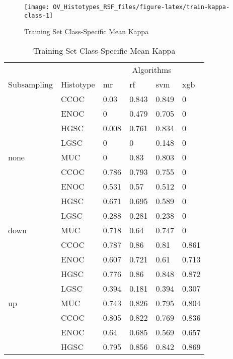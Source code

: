 \documentclass[
]{report}
\begin{document}
\begin{figure}[H]

{\centering \texttt{[image: OV\_Histotypes\_RSF\_files/figure-latex/train-kappa-class-1]} 

}

\caption{Training Set Class-Specific Mean Kappa}\label{fig:train-kappa-class}
\end{figure}

\begin{table}

\caption{\label{tab:train-kappa-class-table}Training Set Class-Specific Mean Kappa}
\centering
\begin{tabular}[t]{l|l|l|l|l|l}
\hline
\multicolumn{2}{c|}{ } & \multicolumn{4}{c}{Algorithms} \\
\cline{3-6}
Subsampling & Histotype & mr & rf & svm & xgb\\
\hline
 & CCOC & 0.03 & 0.843 & 0.849 & 0\\
\cline{2-6}
 & ENOC & 0 & 0.479 & 0.705 & 0\\
\cline{2-6}
 & HGSC & 0.008 & 0.761 & 0.834 & 0\\
\cline{2-6}
 & LGSC & 0 & 0 & 0.148 & 0\\
\cline{2-6}
\multirow{-5}{*}{\raggedright\arraybackslash none} & MUC & 0 & 0.83 & 0.803 & 0\\
\cline{1-6}
 & CCOC & 0.786 & 0.793 & 0.755 & 0\\
\cline{2-6}
 & ENOC & 0.531 & 0.57 & 0.512 & 0\\
\cline{2-6}
 & HGSC & 0.671 & 0.695 & 0.589 & 0\\
\cline{2-6}
 & LGSC & 0.288 & 0.281 & 0.238 & 0\\
\cline{2-6}
\multirow{-5}{*}{\raggedright\arraybackslash down} & MUC & 0.718 & 0.64 & 0.747 & 0\\
\cline{1-6}
 & CCOC & 0.787 & 0.86 & 0.81 & 0.861\\
\cline{2-6}
 & ENOC & 0.607 & 0.721 & 0.61 & 0.713\\
\cline{2-6}
 & HGSC & 0.776 & 0.86 & 0.848 & 0.872\\
\cline{2-6}
 & LGSC & 0.394 & 0.181 & 0.394 & 0.307\\
\cline{2-6}
\multirow{-5}{*}{\raggedright\arraybackslash up} & MUC & 0.743 & 0.826 & 0.795 & 0.804\\
\cline{1-6}
 & CCOC & 0.805 & 0.822 & 0.769 & 0.836\\
\cline{2-6}
 & ENOC & 0.64 & 0.685 & 0.569 & 0.657\\
\cline{2-6}
 & HGSC & 0.795 & 0.856 & 0.842 & 0.869\\

\end{tabular}
\end{table}
\end{document}
